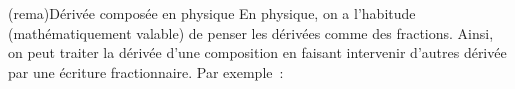 \documentclass[../../main/main.tex]{subfiles}
\begin{document}
\begin{tcb*}[breakable](rema){Dérivée composée en physique}
	En physique, on a l'habitude (mathématiquement valable) de penser les dérivées
	comme des fractions. Ainsi, on peut traiter la dérivée d'une composition en
	faisant intervenir d'autres dérivée par une écriture fractionnaire. Par
	exemple~:

\end{tcb*}
\end{document}
